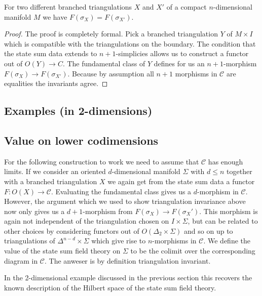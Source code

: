 \begin{theorem}
For two different branched triangulations $X$ and $X'$ of a compact $n$-dimensional manifold $M$ we have $F(\sigma_X)=F(\sigma_{X'})$.
\end{theorem}
\begin{proof} 
The proof is completely formal. Pick a branched triangulation $Y$ of $M\times I$ which is compatible with the triangulations on the boundary. The condition that the state sum data extends to $n+1$-simplicies allows us to construct a functor out of $O(Y)\longrightarrow C $. The fundamental class of $Y$ defines for us an $n+1$-morphism $F(\sigma_X)\longrightarrow F(\sigma_{X'})$. Because by assumption all $n+1$ morphisms in $\mathcal{C}$ are equalities the invariants agree. 
\end{proof}
\begin{remark}
\end{remark}
\subsection{Examples (in 2-dimensions)} 
\subsection{Value on lower codimensions} 
For the following construction to work we need to assume that $\mathcal{C}$ has enough limits. 
If we consider an oriented $d$-dimensional manifold $\Sigma$ with $d\leq n$ together with a  branched triangulation $X$ we again get from the state sum data a functor $F\colon O(X)\longrightarrow \mathcal{C}$. Evaluating the fundamental class gives us a $d$-morphism in
$\mathcal{C}$. However, the argument which we used to show triangulation invariance above now only gives us a $d+1$-morphism from $F(\sigma_X)\longrightarrow  F(\sigma_X')$. 
This morphism is again not independent of the triangulation chosen on $I\times \Sigma $, but can be related to other choices by considering functors out of $O(\Delta_2 \times \Sigma)$ and so on up to triangulations of $\Delta^{n-d}\times \Sigma $ which give rise to $n$-morphisms in $\mathcal{C}$. We define the value of the state sum field theory on $\Sigma$ to be the colimit over the corresponding diagram in $\mathcal{C}$. The anweser is by definition triangulation invariant. 

In the 2-dimensional example discussed in the previous section this recovers the known description of the Hilbert space of the state sum field theory. 